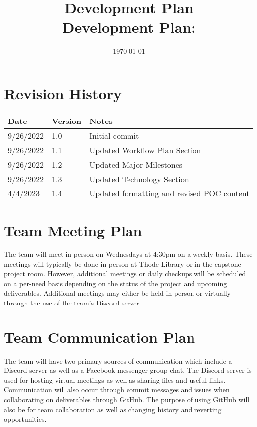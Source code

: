 \documentclass[12pt, titlepage]{article}
\title{Development Plan\\\progname}
\author{\authname}
\date{}
\begin{document}
\title{Development Plan: \progname} 
\author{\authname}
\date{\today}
	
\maketitle


\section*{Revision History}

\begin{tabularx}{\textwidth}{p{3cm}p{2cm}X}
\toprule {\bf Date} & {\bf Version} & {\bf Notes}\\
\midrule
9/26/2022 & 1.0 & Initial commit\\
9/26/2022 & 1.1 & Updated Workflow Plan Section\\
9/26/2022 & 1.2 & Updated Major Milestones\\
9/26/2022 & 1.3 & Updated Technology Section\\
4/4/2023 & 1.4 & Updated formatting and revised POC content\\
\bottomrule
\end{tabularx}

\newpage

\tableofcontents

\listoffigures

\listoftables

\newpage

\section{Team Meeting Plan}
The team will meet in person on Wednesdays at 4:30pm on a weekly basis. These meetings will typically be done in person at Thode Library or in the capstone project room. However, additional meetings or daily checkups will be scheduled on a per-need basis depending on the status of the project and upcoming deliverables. Additional meetings may either be held in person or virtually through the use of the team’s Discord server.

\section{Team Communication Plan}
The team will have two primary sources of communication which include a Discord server as well as a Facebook messenger group chat. The Discord server is used for hosting virtual meetings as well as sharing files and useful links. Communication will also occur through commit messages and issues when collaborating on deliverables through GitHub. The purpose of using GitHub will also be for team collaboration as well as changing history and reverting opportunities. 
\end{document}
